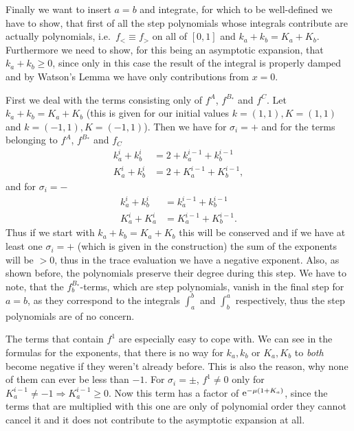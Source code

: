 \begin{MainTheorem}
\begin{Proof}
    Finally we want to insert $a = b$ and integrate, for which to be
    well-defined we have to show, that first of all the step polynomials whose
    integrals contribute are actually polynomials, i.e.\ $f_< \equiv f_>$ on all
    of $[0,1]$ and $k_a + k_b = K_a + K_b$. Furthermore we need to show, for
    this being an asymptotic expansion, that $k_a + k_b \geq 0$, since only in
    this case the result of the integral is properly damped and by Watson's
    Lemma we have only contributions from $x = 0$.

    First we deal with the terms consisting only of $f^A$, $f^{B_*}$ and $f^C$.
    Let $k_a + k_b = K_a + K_b$ (this is given for our initial values $k =
    (1,1), K = (1,1)$ and $k = (-1,1), K=(-1,1)$). Then we have for $\sigma_i =
    +$ and for the terms belonging to $f^A$, $f^{B_*}$ and $f_C$
    \begin{align*}
      k^i_a + k^i_b &= 2 + k^{i-1}_a + k^{i-1}_b \\
      K^i_a + k^i_b &= 2 + K^{i-1}_a + K^{i-1}_b,
    \end{align*}
    and for $\sigma_i = -$
    \begin{align*}
      k^i_a + k^i_b &= k^{i-1}_a + k^{i-1}_b \\
      K^i_a + K^i_a &= K^{i-1}_a + K^{i-1}_b.
    \end{align*}
    Thus if we start with $k_a + k_b = K_a + K_b$ this will be conserved and if
    we have at least one $\sigma_i = +$ (which is given in the construction) the
    sum of the exponents will be $> 0$, thus in the trace evaluation we have a
    negative exponent. Also, as shown before, the polynomials preserve their
    degree during this step. We have to note, that the $f^{B_*}_b$-terms,
    which are step polynomials, vanish in the final step for $a = b$, as they
    correspond to the integrals $\int_a^b$ and $\int_b^a$ respectively, thus
    the step polynomials are of no concern.

    The terms that contain $f^1$ are especially easy to cope with. We can see in
    the formulas for the exponents, that there is no way for $k_a, k_b$ or $K_a,
    K_b$ to \emph{both} become negative if they weren't already before. This is
    also the reason, why none of them can ever be less than $-1$.
    For $\sigma_i = \pm$, $f^1 \neq 0$ only for $K^{i-1}_a \neq -1 \Rightarrow
    K^{i-1}_a \geq 0$. Now this term has a factor of $\mathrm e^{-\mu (1+K_a)}$, since
    the terms that are multiplied with this one are only of polynomial order
    they cannot cancel it and it does not contribute to the asymptotic expansion
    at all.


\end{Proof}
\end{MainTheorem}
